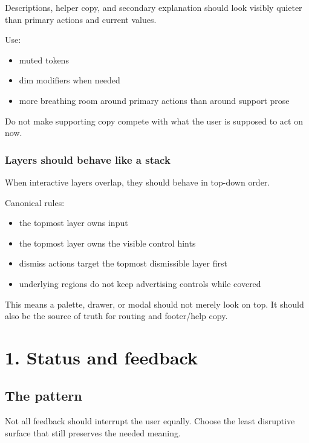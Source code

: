 Descriptions, helper copy, and secondary explanation should look visibly quieter than primary actions and current values.

Use:

\begin{itemize}
\tightlist
\item
  muted tokens
\item
  dim modifiers when needed
\item
  more breathing room around primary actions than around support prose
\end{itemize}

Do not make supporting copy compete with what the user is supposed to act on now.

\subsubsection{Layers should behave like a stack}\label{record-023-layers-should-behave-like-a-stack}

When interactive layers overlap, they should behave in top-down order.

Canonical rules:

\begin{itemize}
\tightlist
\item
  the topmost layer owns input
\item
  the topmost layer owns the visible control hints
\item
  dismiss actions target the topmost dismissible layer first
\item
  underlying regions do not keep advertising controls while covered
\end{itemize}

This means a palette, drawer, or modal should not merely look on top. It should also be the source of truth for routing and footer/help copy.

\section{1. Status and feedback}\label{record-023-status-and-feedback}

\subsection{The pattern}\label{record-023-the-pattern-1}

Not all feedback should interrupt the user equally. Choose the least disruptive surface that still preserves the needed meaning.

